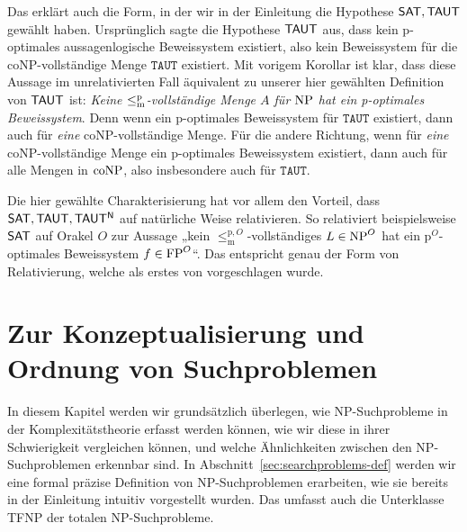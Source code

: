 Das erklärt auch die Form, in der wir in der Einleitung die Hypothese $\mathsf{SAT}, \mathsf{TAUT}$ gewählt haben.
Ursprünglich sagte die Hypothese $\mathsf{TAUT}$ aus, dass kein p-optimales aussagenlogische Beweissystem existiert, also kein Beweissystem für die coNP-vollständige Menge $\mathtt{TAUT}$ existiert.
Mit vorigem Korollar ist klar, dass diese Aussage im unrelativierten Fall äquivalent zu unserer hier gewählten Definition von $\mathsf{TAUT}$ ist: \emph{Keine $\leq_\mathrm{m}^\mathrm{p}$-vollständige Menge $A$ für $\mathrm{NP}$ hat ein p-optimales Beweissystem}.
Denn wenn ein p-optimales Beweissystem für $\mathtt{TAUT}$ existiert, dann auch für \emph{eine} coNP-vollständige Menge.
Für die andere Richtung, wenn für \emph{eine} coNP-vollständige Menge ein p-optimales Beweissystem existiert, dann auch für alle Mengen in $\mathrm{coNP}$, also insbesondere auch für $\mathtt{TAUT}$.
%

Die hier gewählte Charakterisierung hat vor allem den Vorteil, dass $\mathsf{SAT}, \mathsf{TAUT}, \mathsf{TAUT^N}$ auf natürliche Weise relativieren.
So relativiert beispielsweise $\mathsf{SAT}$ auf Orakel $O$ zur Aussage „kein $\leq_\mathrm{m}^{\mathrm p,O}$-vollständiges $L\in\mathrm{NP}^O$ hat ein p${}^O$-optimales Beweissystem $f\in\mathrm{FP}^O$“.
Das entspricht genau der Form von Relativierung, welche als erstes von \textcite{dose_oracle_2020} vorgeschlagen wurde.



\chapter{Zur Konzeptualisierung und Ordnung von Suchproblemen}\label{chap:searchproblems}

In diesem Kapitel werden wir grundsätzlich überlegen, wie NP-Suchprobleme in der Komplexitätstheorie erfasst werden können, wie wir diese in ihrer Schwierigkeit vergleichen können, und welche Ähnlichkeiten zwischen den NP-Suchproblemen erkennbar sind. 
In Abschnitt~\ref{sec:searchproblems-def} werden wir eine formal präzise Definition von NP-Suchproblemen erarbeiten, wie sie bereits in der Einleitung intuitiv vorgestellt wurden. Das umfasst auch die Unterklasse TFNP der totalen NP-Suchprobleme.

